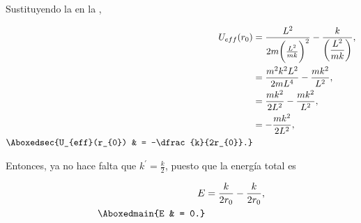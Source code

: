 \documentclass[../main.tex]{subfiles}
\begin{document}
\begin{problema}
	Sustituyendo la  en la ,

	\begin{align*}
		U_{eff}(r_{0})            & = \dfrac{L^{2}}{2m \biggl(\tfrac{L^{2}}{mk}\biggr)^{2}} - \dfrac{k}{\biggl(\dfrac{L^{2}}{mk}\biggr)}, \\
		                          & = \dfrac{m^{2}k^{2}L^{2}}{2mL^{4}} - \dfrac{mk^{2}}{L^{2}},                                           \\
		                          & = \dfrac{mk^{2}}{2L^{2}} - \dfrac{mk^{2}}{L^{2}},                                                     \\
		                          & = -\dfrac{mk^{2}}{2L^{2}},                                                                            \\
		\Aboxedsec{U_{eff}(r_{0}) & = -\dfrac{k}{2r_{0}}.}
	\end{align*}

	Entonces, ya no hace falta que \(k^{\prime} = \tfrac{k}{2}\), puesto que la energía total es

	\begin{align*}
		E             & = \dfrac{k}{2r_{0}} - \dfrac{k}{2r_{0}}, \\
		\Aboxedmain{E & = 0.}
	\end{align*}
\end{problema}
\end{document}
